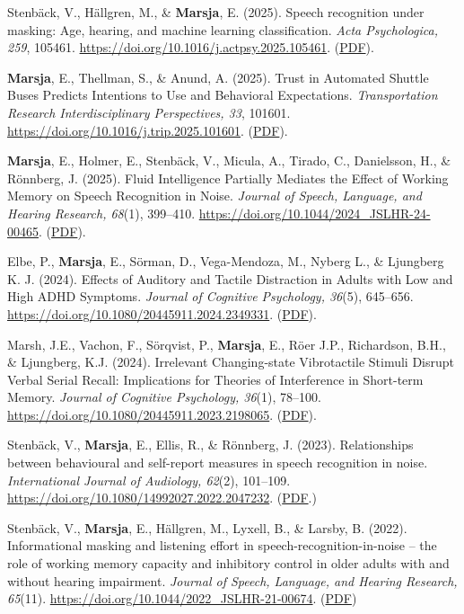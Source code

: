 \documentclass[]{article}
\begin{document}
Stenbäck, V., Hällgren, M., \& \textbf{Marsja}, E. (2025). Speech
recognition under masking: Age, hearing, and machine learning
classification. \emph{Acta Psychologica, 259}, 105461.
\url{https://doi.org/10.1016/j.actpsy.2025.105461}.
(\href{https://tinyurl.com/spinml}{PDF}).

\textbf{Marsja}, E., Thellman, S., \& Anund, A. (2025). Trust in
Automated Shuttle Buses Predicts Intentions to Use and Behavioral
Expectations. \emph{Transportation Research Interdisciplinary
Perspectives, 33}, 101601.
\url{https://doi.org/10.1016/j.trip.2025.101601}.
(\href{https://tinyurl.com/trusttrip}{PDF}).

\textbf{Marsja}, E., Holmer, E., Stenbäck, V., Micula, A., Tirado, C.,
Danielsson, H., \& Rönnberg, J. (2025). Fluid Intelligence Partially
Mediates the Effect of Working Memory on Speech Recognition in Noise.
\emph{Journal of Speech, Language, and Hearing Research, 68}(1),
399--410. \url{https://doi.org/10.1044/2024_JSLHR-24-00465}.
(\href{https://tinyurl.com/gfspin}{PDF}).

Elbe, P., \textbf{Marsja}, E., Sörman, D., Vega-Mendoza, M., Nyberg L.,
\& Ljungberg K. J. (2024). Effects of Auditory and Tactile Distraction
in Adults with Low and High ADHD Symptoms. \emph{Journal of Cognitive
Psychology, 36}(5), 645--656.
\url{https://doi.org/10.1080/20445911.2024.2349331}.
(\href{https://tinyurl.com/elbevibra}{PDF}).

Marsh, J.E., Vachon, F., Sörqvist, P., \textbf{Marsja}, E., Röer J.P.,
Richardson, B.H., \& Ljungberg, K.J. (2024). Irrelevant Changing-state
Vibrotactile Stimuli Disrupt Verbal Serial Recall: Implications for
Theories of Interference in Short-term Memory. \emph{Journal of
Cognitive Psychology, 36}(1), 78--100.
\url{https://doi.org/10.1080/20445911.2023.2198065}.
(\href{https://tinyurl.com/vibradistr}{PDF}).

Stenbäck, V., \textbf{Marsja}, E., Ellis, R., \& Rönnberg, J. (2023).
Relationships between behavioural and self-report measures in speech
recognition in noise. \emph{International Journal of Audiology, 62}(2),
101--109. \url{https://doi.org/10.1080/14992027.2022.2047232}.
(\href{https://tinyurl.com/IJA22}{PDF}.)

Stenbäck, V., \textbf{Marsja}, E., Hällgren, M., Lyxell, B., \& Larsby,
B. (2022). Informational masking and listening effort in
speech-recognition-in-noise -- the role of working memory capacity and
inhibitory control in older adults with and without hearing impairment.
\emph{Journal of Speech, Language, and Hearing Research, 65}(11).
\url{https://doi.org/10.1044/2022_JSLHR-21-00674}.
(\href{https://tinyurl.com/SPIN22b}{PDF})
\end{document}
